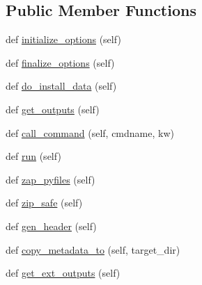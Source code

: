 \subsection*{Public Member Functions}
\begin{DoxyCompactItemize}
\item 
def \hyperlink{classsetuptools_1_1command_1_1bdist__egg_1_1bdist__egg_a5e0bf3917774256abc0c560b0aa60666}{initialize\+\_\+options} (self)
\item 
def \hyperlink{classsetuptools_1_1command_1_1bdist__egg_1_1bdist__egg_a2df3e0eea55a526265f27e5e3450a7c9}{finalize\+\_\+options} (self)
\item 
def \hyperlink{classsetuptools_1_1command_1_1bdist__egg_1_1bdist__egg_a7e5c3429cd7af6d1666efa7d302a99a9}{do\+\_\+install\+\_\+data} (self)
\item 
def \hyperlink{classsetuptools_1_1command_1_1bdist__egg_1_1bdist__egg_a803f6680a62a646555384fc3ae06747d}{get\+\_\+outputs} (self)
\item 
def \hyperlink{classsetuptools_1_1command_1_1bdist__egg_1_1bdist__egg_a2e5aad64f49a4cd20330927ede1cf93f}{call\+\_\+command} (self, cmdname, kw)
\item 
def \hyperlink{classsetuptools_1_1command_1_1bdist__egg_1_1bdist__egg_aba0d75c484a4998875ab89bf5b351703}{run} (self)
\item 
def \hyperlink{classsetuptools_1_1command_1_1bdist__egg_1_1bdist__egg_a3f9e7e3dc50f278d01164d5e62617904}{zap\+\_\+pyfiles} (self)
\item 
def \hyperlink{classsetuptools_1_1command_1_1bdist__egg_1_1bdist__egg_ab0029147e818fdc5f7ad9d764543d433}{zip\+\_\+safe} (self)
\item 
def \hyperlink{classsetuptools_1_1command_1_1bdist__egg_1_1bdist__egg_afa4ed30936b97f48ffb17465728fc0c6}{gen\+\_\+header} (self)
\item 
def \hyperlink{classsetuptools_1_1command_1_1bdist__egg_1_1bdist__egg_a35fe5f263d15d180f820c12cea33760c}{copy\+\_\+metadata\+\_\+to} (self, target\+\_\+dir)
\item 
def \hyperlink{classsetuptools_1_1command_1_1bdist__egg_1_1bdist__egg_a965de46610ecd45acb139f12c85d35f7}{get\+\_\+ext\+\_\+outputs} (self)
\end{DoxyCompactItemize}
